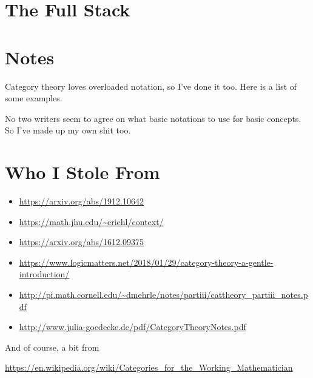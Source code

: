 \section{The Full Stack}

\section{Notes}

Category theory loves overloaded notation, so I've done it too. Here is a list of some
examples.

No two writers seem to agree on what basic notations to use for basic concepts. So I've
made up my own shit too.

\section{Who I Stole From}

\small
\begin{itemize}
\item \url{https://arxiv.org/abs/1912.10642}

\item \url{https://math.jhu.edu/~eriehl/context/}

\item \url{https://arxiv.org/abs/1612.09375}

\item \url{https://www.logicmatters.net/2018/01/29/category-theory-a-gentle-introduction/}

\item \url{http://pi.math.cornell.edu/~dmehrle/notes/partiii/cattheory_partiii_notes.pdf}

\item \url{http://www.julia-goedecke.de/pdf/CategoryTheoryNotes.pdf}

\end{itemize}

And of course, a bit from

\url{https://en.wikipedia.org/wiki/Categories_for_the_Working_Mathematician}